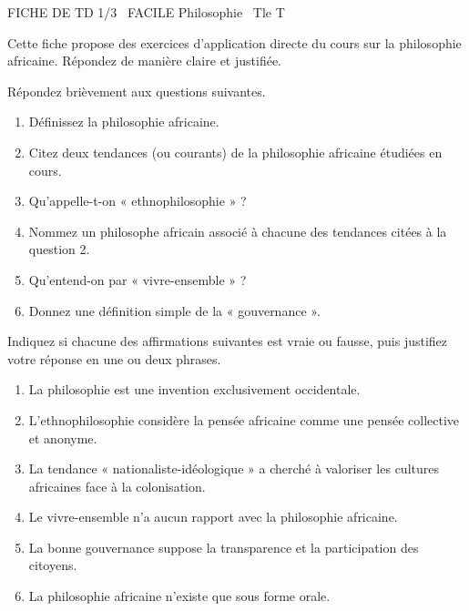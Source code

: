 \documentclass[11pt]{article}
\begin{document}
\begin{tcolorbox}[enhanced,colback=popink,colframe=popink,arc=10pt,boxrule=0pt,left=12pt,right=12pt,top=9pt,bottom=9pt]
{\color{white}\popxbold\small FICHE DE TD 1/3 \textbullet\ FACILE \hfill Philosophie \textbullet\ Tle T\par}
\end{tcolorbox}
\vspace{4pt}
Cette fiche propose des exercices d'application directe du cours sur la philosophie africaine. Répondez de manière claire et justifiée.

\begin{exercice}
Répondez brièvement aux questions suivantes.
\begin{enumerate}
\item Définissez la philosophie africaine.
\item Citez deux tendances (ou courants) de la philosophie africaine étudiées en cours.
\item Qu'appelle-t-on « ethnophilosophie » ?
\item Nommez un philosophe africain associé à chacune des tendances citées à la question 2.
\item Qu'entend-on par « vivre-ensemble » ?
\item Donnez une définition simple de la « gouvernance ».
\end{enumerate}
\end{exercice}

\begin{exercice}
Indiquez si chacune des affirmations suivantes est vraie ou fausse, puis justifiez votre réponse en une ou deux phrases.
\begin{enumerate}
\item La philosophie est une invention exclusivement occidentale.
\item L'ethnophilosophie considère la pensée africaine comme une pensée collective et anonyme.
\item La tendance « nationaliste-idéologique » a cherché à valoriser les cultures africaines face à la colonisation.
\item Le vivre-ensemble n'a aucun rapport avec la philosophie africaine.
\item La bonne gouvernance suppose la transparence et la participation des citoyens.
\item La philosophie africaine n'existe que sous forme orale.
\end{enumerate}
\end{exercice}
\end{document}
